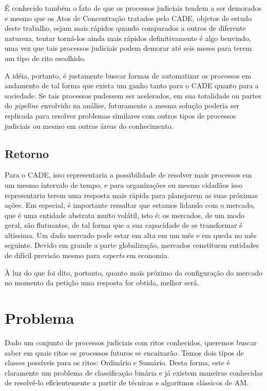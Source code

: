 \documentclass[11pt]{report}
\begin{document}
É conhecido também o fato de que os processos judiciais tendem a ser demorados e mesmo que os Atos de Concentração tratados pelo CADE, objetos de estudo deste
trabalho, sejam mais rápidos quando comparados a outros de diferente natureza, tentar torná-los ainda mais rápidos definitivamente é algo benvindo, uma vez que
tais processos judiciais podem demorar até seis meses para terem um tipo de rito escolhido.

A idéia, portanto, é justamente buscar formas de automatizar os processos em andamento de tal forma que exista um ganho tanto para o CADE quanto para a sociedade.
Se tais processos pudessem ser acelerados, em sua totalidade ou partes do \textit{pipeline} envolvido na análise, futuramente a mesma solução poderia ser replicada
para resolver problemas similares com outros tipos de processos judiciais ou mesmo em outras áreas do conhecimento.

\subsection{Retorno}

\indent\indent Para o CADE, isso representaria a possibilidade de resolver mais processos em um mesmo intervalo de tempo, e para organizações ou mesmo cidadãos isso representaria
terem uma resposta mais rápida para planejarem as suas próximas ações. Em especial, é importante ressaltar que estamos lidando com o mercado, que é uma
entidade abstrata muito volátil, isto é: os mercados, de um modo geral, são flutuantes, de tal forma que a sua capacidade de se transformar é altíssima.
Um dado mercado pode estar em alta em um mês e em queda no mês seguinte. Devido em grande a parte globalização, mercados constituem entidades de difícil previsão
mesmo para \textit{experts} em economia.

À luz do que foi dito, portanto, quanto mais próximo da configuração do mercado no momento da petição uma resposta for obtida, melhor será.

\section{Problema}

\indent\indent Dado um conjunto de processos judiciais com ritos conhecidos, queremos buscar saber em quais ritos os processos futuros se encaixarão. Temos dois tipos de classes possíveis para os ritos:
Ordinário e Sumário. Desta forma, este é claramente um problema de classificação binária e já existem maneiras conhecidas de resolvê-lo eficientemente a partir
de técnicas e algoritmos clássicos de AM.
\end{document}
